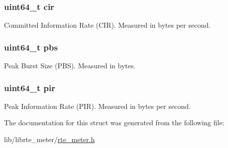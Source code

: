 \subsubsection[{cir}]{\setlength{\rightskip}{0pt plus 5cm}uint64\+\_\+t cir}\label{structrte__meter__trtcm__params_a882cbe4a787376c3a4d55bbf0b6e1f13}
Committed Information Rate (C\+I\+R). Measured in bytes per second. \hypertarget{structrte__meter__trtcm__params_aac8f0f5688bed97bc62949c37308b13d}{}
\subsubsection[{pbs}]{\setlength{\rightskip}{0pt plus 5cm}uint64\+\_\+t pbs}\label{structrte__meter__trtcm__params_aac8f0f5688bed97bc62949c37308b13d}
Peak Burst Size (P\+B\+S). Measured in bytes. \hypertarget{structrte__meter__trtcm__params_a2acc9a04d3a8ffeeb3b95f142ee15be7}{}
\subsubsection[{pir}]{\setlength{\rightskip}{0pt plus 5cm}uint64\+\_\+t pir}\label{structrte__meter__trtcm__params_a2acc9a04d3a8ffeeb3b95f142ee15be7}
Peak Information Rate (P\+I\+R). Measured in bytes per second. 

The documentation for this struct was generated from the following file\+:\begin{DoxyCompactItemize}
\item 
lib/librte\+\_\+meter/\hyperlink{rte__meter_8h}{rte\+\_\+meter.\+h}\end{DoxyCompactItemize}

